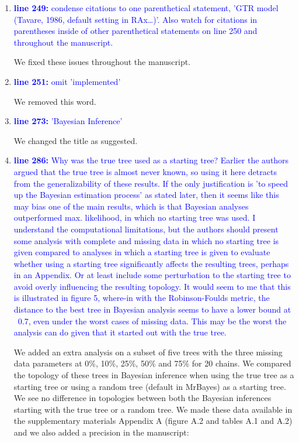 \documentclass[12pt,letterpaper]{article}
\begin{document}
\begin{enumerate}

\item{\textcolor{blue}{\textbf{line 249:} condense citations to one parenthetical statement, 'GTR model (Tavare, 1986, default setting in RAx…)'. Also watch for citations in parentheses inside of other parenthetical statements on line 250 and throughout the manuscript. }}

We fixed these issues throughout the manuscript.

\item{\textcolor{blue}{\textbf{line 251:} omit 'implemented'}}

We removed this word.

\item{\textcolor{blue}{\textbf{line 273:} 'Bayesian Inference'}}

We changed the title as suggested.

\item{\textcolor{blue}{\textbf{line 286:} Why was the true tree used as a starting tree? Earlier the authors argued that the true tree is almost never known, so using it here detracts from the generalizability of these results. If the only justification is 'to speed up the Bayesian estimation process' as stated later, then it seems like this may bias one of the main results, which is that Bayesian analyses outperformed max. likelihood, in which no starting tree was used. I understand the computational limitations, but the authors should present some analysis with complete and missing data in which no starting tree is given compared to analyses in which a starting tree is given to evaluate whether using a starting tree significantly affects the resulting trees, perhaps in an Appendix. Or at least include some perturbation to the starting tree to avoid overly influencing the resulting topology. It would seem to me that this is illustrated in figure 5, where-in with the Robinson-Foulds metric, the distance to the best tree in Bayesian analysis seems to have a lower bound at ~0.7, even under the worst cases of missing data. This may be the worst the analysis can do given that it started out with the true tree. }}

We added an extra analysis on a subset of five trees with the three missing data parameters at 0\%, 10\%, 25\%, 50\% and 75\% for 20 chains. We compared the topology of these trees in Bayesian inference when using the true tree as a starting tree or using a random tree (default in MrBayes) as a starting tree. We see no difference in topologies between both the Bayesian inferences starting with the true tree or a random tree. We made these data available in the supplementary materials Appendix A (figure A.2 and tables A.1 and A.2) and we also added a precision in the manuscript:


\end{enumerate}
\end{document}
